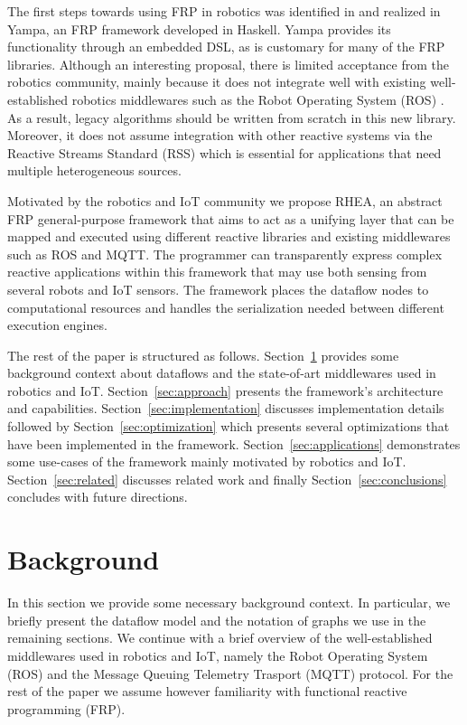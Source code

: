 \documentclass[sigplan,screen,10pt]{acmart}
\begin{document}
The first steps towards using FRP in robotics was identified in \cite{arrows_robots}
and realized in Yampa, an FRP framework
developed in Haskell. Yampa provides its functionality through an embedded DSL,
as is customary for many of the FRP libraries. Although an interesting proposal,
there is limited acceptance from the robotics community, mainly because it does
not integrate well with existing well-established robotics middlewares such as
the Robot Operating System (ROS) \cite{ROS}. As a result, legacy algorithms should be
written from scratch in this new library. Moreover, it does not assume integration
with other reactive systems via the Reactive Streams Standard (RSS)
which is essential for applications that need multiple heterogeneous sources.

Motivated by the robotics and IoT community we propose \textsc{RHEA}, an abstract
FRP general-purpose framework that aims to act as a unifying layer that can
be mapped and executed using different reactive libraries and existing middlewares
such as ROS and MQTT. The programmer can transparently express complex reactive
applications within this framework that may use both sensing from several robots
and IoT sensors. The framework places the dataflow nodes to computational resources
and handles the serialization needed between different execution engines.

The rest of the paper is structured as follows.
Section~\ref{sec:background} provides some background context about dataflows and
the state-of-art middlewares used in robotics and IoT.
Section~\ref{sec:approach} presents the framework's architecture and capabilities.
Section~\ref{sec:implementation} discusses implementation details followed by
Section~\ref{sec:optimization} which presents several optimizations that have
been implemented in the framework. Section~\ref{sec:applications} demonstrates
some use-cases of the framework mainly motivated by robotics and IoT.
Section~\ref{sec:related} discusses related work and finally
Section~\ref{sec:conclusions} concludes with future directions.

\section{Background} \label{sec:background}
In this section we provide some necessary background context. In particular, we
briefly present the dataflow model and the notation of graphs we use in the
remaining sections. We continue with a brief overview of the well-established
middlewares used in robotics and IoT, namely the Robot Operating System (ROS)
and the Message Queuing Telemetry Trasport (MQTT) protocol.
For the rest of the paper we assume however familiarity with functional
reactive programming (FRP).
\end{document}
